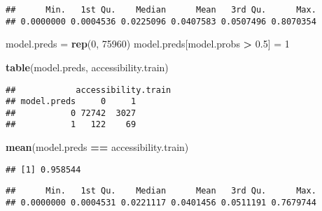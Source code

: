 \documentclass[
]{article}
\newenvironment{Shaded}{\begin{snugshade}}{\end{snugshade}}
\newcommand{\AttributeTok}[1]{\textcolor[rgb]{0.13,0.29,0.53}{#1}}
\newcommand{\DecValTok}[1]{\textcolor[rgb]{0.00,0.00,0.81}{#1}}
\newcommand{\FloatTok}[1]{\textcolor[rgb]{0.00,0.00,0.81}{#1}}
\newcommand{\FunctionTok}[1]{\textcolor[rgb]{0.13,0.29,0.53}{\textbf{#1}}}
\newcommand{\NormalTok}[1]{#1}
\newcommand{\OtherTok}[1]{\textcolor[rgb]{0.56,0.35,0.01}{#1}}
\newcommand{\SpecialCharTok}[1]{\textcolor[rgb]{0.81,0.36,0.00}{\textbf{#1}}}
\newcommand{\StringTok}[1]{\textcolor[rgb]{0.31,0.60,0.02}{#1}}
\begin{document}
\begin{verbatim}
##      Min.   1st Qu.    Median      Mean   3rd Qu.      Max. 
## 0.0000000 0.0004536 0.0225096 0.0407583 0.0507496 0.8070354
\end{verbatim}

\begin{Shaded}
\begin{Highlighting}[]
\NormalTok{model.preds }\OtherTok{=} \FunctionTok{rep}\NormalTok{(}\DecValTok{0}\NormalTok{, }\DecValTok{75960}\NormalTok{)}
\NormalTok{model.preds[model.probs }\SpecialCharTok{\textgreater{}} \FloatTok{0.5}\NormalTok{] }\OtherTok{=} \DecValTok{1}

\FunctionTok{table}\NormalTok{(model.preds, accessibility.train)}
\end{Highlighting}
\end{Shaded}

\begin{verbatim}
##            accessibility.train
## model.preds     0     1
##           0 72742  3027
##           1   122    69
\end{verbatim}

\begin{Shaded}
\begin{Highlighting}[]
\FunctionTok{mean}\NormalTok{(model.preds }\SpecialCharTok{==}\NormalTok{ accessibility.train)}
\end{Highlighting}
\end{Shaded}

\begin{verbatim}
## [1] 0.958544
\end{verbatim}

\begin{Shaded}
\end{Shaded}

\begin{verbatim}
##      Min.   1st Qu.    Median      Mean   3rd Qu.      Max. 
## 0.0000000 0.0004531 0.0221117 0.0401456 0.0511191 0.7679744
\end{verbatim}
\end{document}
